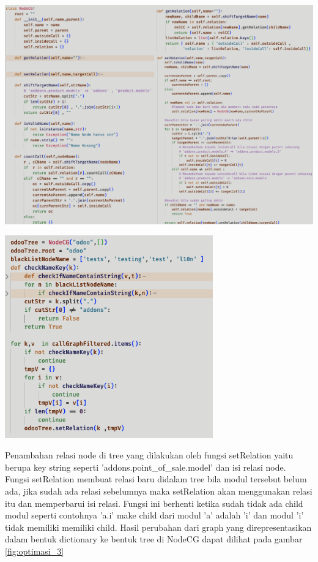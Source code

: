 \begin{center}
	\includegraphics[width=14cm]{img/bab_4/optimisasi_1.png}
	\label{fig:optimasi_1}
\end{center}

\begin{center}
	\includegraphics[width=9cm]{img/bab_4/optimisasi_2.png}
	\label{fig:optimasi_2}
\end{center}

Penambahan relasi node di tree yang dilakukan oleh fungsi setRelation yaitu berupa key string seperti 'addons.point{\_}of{\_}sale.model' dan isi relasi node. Fungsi setRelation membuat relasi baru didalam tree bila modul tersebut belum ada, jika sudah ada relasi sebelumnya maka setRelation akan menggunakan relasi itu dan memperbarui isi relasi. Fungsi ini berhenti ketika sudah tidak ada child modul seperti contohnya 'a.i' make child dari modul 'a' adalah 'i' dan modul 'i' tidak memiliki memiliki child. Hasil perubahan dari graph yang direpresentasikan dalam bentuk dictionary ke bentuk tree di NodeCG dapat dilihat pada gambar \ref{fig:optimasi_3}

